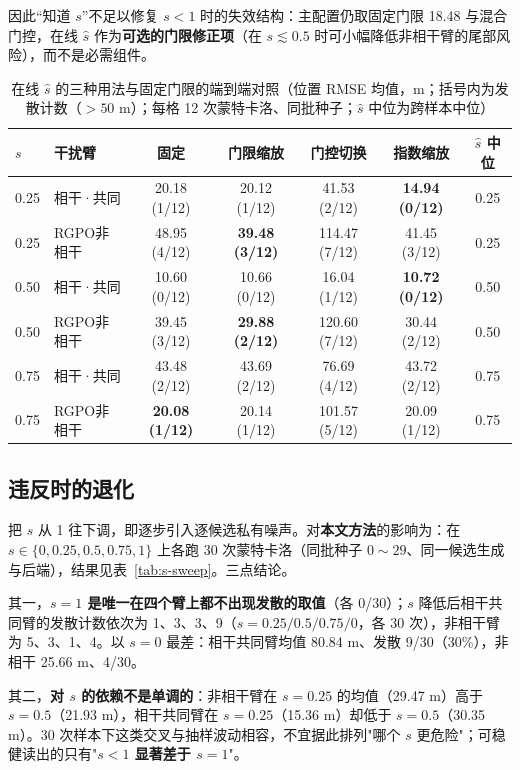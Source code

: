 \documentclass[UTF8,a4paper,zihao=-4]{ctexart}
\begin{document}
因此“知道 \(s\)”不足以修复 \(s<1\) 时的失效结构：主配置仍取固定门限 18.48 与混合门控，在线 \(\hat s\) 作为\textbf{可选的门限修正项}（在 \(s\lesssim0.5\) 时可小幅降低非相干臂的尾部风险），而不是必需组件。

\begin{table}[htbp]
\centering
\caption{在线 \(\hat s\) 的三种用法与固定门限的端到端对照（位置 RMSE 均值，m；括号内为发散计数（$>50$ m）；每格 12 次蒙特卡洛、同批种子；\(\hat s\) 中位为跨样本中位）}\label{tab:s-online}
\small
\begin{tabular}{@{}llccccc@{}}
\toprule
\(s\) & 干扰臂 & 固定 & 门限缩放 & 门控切换 & 指数缩放 & \(\hat s\) 中位\\
\midrule
0.25 & 相干·共同 & 20.18 (1/12) & 20.12 (1/12) & 41.53 (2/12) & \textbf{14.94 (0/12)} & 0.25\\
0.25 & RGPO非相干 & 48.95 (4/12) & \textbf{39.48 (3/12)} & 114.47 (7/12) & 41.45 (3/12) & 0.25\\
0.50 & 相干·共同 & 10.60 (0/12) & 10.66 (0/12) & 16.04 (1/12) & \textbf{10.72 (0/12)} & 0.50\\
0.50 & RGPO非相干 & 39.45 (3/12) & \textbf{29.88 (2/12)} & 120.60 (7/12) & 30.44 (2/12) & 0.50\\
0.75 & 相干·共同 & 43.48 (2/12) & 43.69 (2/12) & 76.69 (4/12) & 43.72 (2/12) & 0.75\\
0.75 & RGPO非相干 & \textbf{20.08 (1/12)} & 20.14 (1/12) & 101.57 (5/12) & 20.09 (1/12) & 0.75\\
\bottomrule
\end{tabular}
\end{table}

\subsection{违反时的退化}

把 \(s\) 从 1 往下调，即逐步引入逐候选私有噪声。对\textbf{本文方法}的影响为：在 \(s\in\{0,0.25,0.5,0.75,1\}\) 上各跑 30 次蒙特卡洛（同批种子 $0\sim29$、同一候选生成与后端），结果见表~\ref{tab:s-sweep}。三点结论。

其一，\textbf{\(s=1\) 是唯一在四个臂上都不出现发散的取值}（各 0/30）；\(s\) 降低后相干共同臂的发散计数依次为 1、3、3、9（\(s=0.25/0.5/0.75/0\)，各 30 次），非相干臂为 5、3、1、4。以 \(s=0\) 最差：相干共同臂均值 80.84 m、发散 9/30（30\%），非相干 25.66 m、4/30。

其二，\textbf{对 \(s\) 的依赖不是单调的}：非相干臂在 \(s=0.25\) 的均值（29.47 m）高于 \(s=0.5\)（21.93 m），相干共同臂在 \(s=0.25\)（15.36 m）却低于 \(s=0.5\)（30.35 m）。30 次样本下这类交叉与抽样波动相容，不宜据此排列"哪个 \(s\) 更危险"；可稳健读出的只有"\textbf{\(s<1\) 显著差于 \(s=1\)}"。
\end{document}
